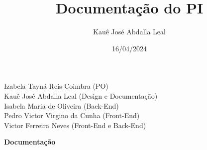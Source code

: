 \documentclass{article}
\title{Documentação do PI}
\author{Kauê José Abdalla Leal}
\date{16/04/2024}
\begin{document}
\maketitle

\begin{center}
Izabela Tayná Reis Coimbra (PO)\\
Kauê José Abdalla Leal (Design e Documentação)\\
Isabela Maria de Oliveira (Back-End)\\
Pedro Victor Virgino da Cunha (Front-End)\\
Victor Ferreira Neves (Front-End e Back-End)
\end{center}

\newpage

\begin{center}
\textbf{Documentação}
\end{center}
\end{document}
